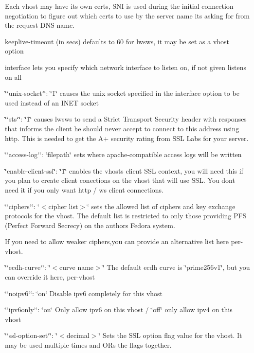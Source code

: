 Each vhost may have its own certs, S\+NI is used during the initial connection negotiation to figure out which certs to use by the server name it\textquotesingle{}s asking for from the request D\+NS name.


\begin{DoxyItemize}
\item {\ttfamily keeplive-\/timeout} (in secs) defaults to 60 for lwsws, it may be set as a vhost option
\item {\ttfamily interface} lets you specify which network interface to listen on, if not given listens on all
\item \char`\"{}`unix-\/socket`\char`\"{}\+: \char`\"{}1\char`\"{} causes the unix socket specified in the interface option to be used instead of an I\+N\+ET socket
\item \char`\"{}`sts`\char`\"{}\+: \char`\"{}1\char`\"{} causes lwsws to send a Strict Transport Security header with responses that informs the client he should never accept to connect to this address using http. This is needed to get the A+ security rating from S\+SL Labs for your server.
\item \char`\"{}`access-\/log`\char`\"{}\+: \char`\"{}filepath\char`\"{} sets where apache-\/compatible access logs will be written
\item {\ttfamily \char`\"{}enable-\/client-\/ssl\char`\"{}}\+: {\ttfamily \char`\"{}1\char`\"{}} enables the vhost\textquotesingle{}s client S\+SL context, you will need this if you plan to create client conections on the vhost that will use S\+SL. You don\textquotesingle{}t need it if you only want http / ws client connections.
\item \char`\"{}`ciphers`\char`\"{}\+: \char`\"{}$<$cipher list$>$\char`\"{} sets the allowed list of ciphers and key exchange protocols for the vhost. The default list is restricted to only those providing P\+FS (Perfect Forward Secrecy) on the author\textquotesingle{}s Fedora system.
\end{DoxyItemize}

If you need to allow weaker ciphers,you can provide an alternative list here per-\/vhost.


\begin{DoxyItemize}
\item \char`\"{}`ecdh-\/curve`\char`\"{}\+: \char`\"{}$<$curve name$>$\char`\"{} The default ecdh curve is \char`\"{}prime256v1\char`\"{}, but you can override it here, per-\/vhost
\item \char`\"{}`noipv6`\char`\"{}\+: \char`\"{}on\char`\"{} Disable ipv6 completely for this vhost
\item \char`\"{}`ipv6only`\char`\"{}\+: \char`\"{}on\char`\"{} Only allow ipv6 on this vhost / \char`\"{}off\char`\"{} only allow ipv4 on this vhost
\item \char`\"{}`ssl-\/option-\/set`\char`\"{}\+: \char`\"{}$<$decimal$>$\char`\"{} Sets the S\+SL option flag value for the vhost. It may be used multiple times and OR\textquotesingle{}s the flags together.
\end{DoxyItemize}

